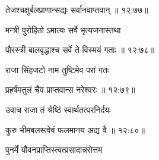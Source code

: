 
{\devanagarifont तेजश्चक्षुर्बलप्राणान्सद्यः सर्वानवाप्तवान् {॥ १२:७७॥} \veg\dontdisplaylinenum }%

{\devanagarifont मन्त्री पुरोहितो ऽमात्यः सर्वे भृत्यजनास्तथा \thinspace{\dandab} \dontdisplaylinenum }%


{\devanagarifont पौरस्त्री बालवृद्धाश्च सर्वे ते विस्मयं गताः {॥ १२:७८॥} \veg\dontdisplaylinenum }%

{\devanagarifont राजा सिंहजटो नाम तुष्टिमेव परां गतः \thinspace{\dandab} \dontdisplaylinenum }%


{\devanagarifont प्रहर्षमतुलं चैव प्राप्तवान्स नरेश्वरः {॥ १२:७९॥} \veg\dontdisplaylinenum }%
 
{\devanagarifont उवाच राजा तं श्रेष्ठिं स्वार्थतत्परनिर्दयः \thinspace{\dandab} \dontdisplaylinenum }%


{\devanagarifont कुरु भीमबलस्त्वेवं फलमानय अद्य वै {॥ १२:८०॥} \veg\dontdisplaylinenum }%

{\devanagarifont पुनर्मे यौवनप्राप्तिस्त्वत्प्रसादान्नरोत्तम \thinspace{\dandab} \dontdisplaylinenum }%

